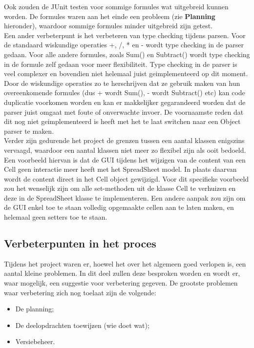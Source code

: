 \documentclass[a4paper,11pt]{article}
\begin{document}
Ook zouden de JUnit testen voor sommige formules wat uitgebreid kunnen worden. De formules waren aan het einde een probleem (zie \textbf{Planning} hieronder), waardoor sommige formules minder uitgebreid zijn getest.\\

Een ander verbeterpunt is het verbeteren van type checking tijdens parsen. Voor de standaard wiskundige operaties +, /, * en - wordt type checking in de parser gedaan. Voor alle andere formules, zoals Sum() en Subtract() wordt type checking in de formule zelf gedaan voor meer flexibiliteit. Type checking in de parser is veel complexer en bovendien niet helemaal juist geimplementeerd op dit moment. Door de wiskundige operaties zo te herschrijven dat ze gebruik maken van hun overeenkomende formules (dus + wordt Sum(), - wordt Subtract() etc) kan code duplicatie voorkomen worden en kan er makkelijker gegarandeerd worden dat de parser juist omgaat met foute of onverwachte invoer. De voornaamste reden dat dit nog niet geimplementeerd is heeft met het te laat switchen naar een Object parser te maken.\\

Verder zijn gedurende het project de grenzen tussen een aantal klassen enigszins vervaagd, waardoor een aantal klassen niet meer zo flexibel zijn als ooit bedoeld. Een voorbeeld hiervan is dat de GUI tijdens het wijzigen van de content van een Cell geen interactie meer heeft met het SpreadSheet model. In plaats daarvan wordt de content direct in het Cell object gewijzigd. Voor dit specifieke voorbeeld zou het wenselijk zijn om alle set-methoden uit de klasse Cell te verhuizen en deze in de SpreadSheet klasse te implementeren. Een andere aanpak zou zijn om de GUI enkel toe te staan volledig opgemaakte cellen aan te laten maken, en helemaal geen setters toe te staan.

\subsection{Verbeterpunten in het proces}
Tijdens het project waren er, hoewel het over het algemeen goed verlopen is, een aantal kleine problemen. In dit deel zullen deze besproken worden en wordt er, waar mogelijk, een suggestie voor verbetering gegeven. De grootste problemen waar verbetering zich nog toelaat zijn de volgende:
\begin{itemize}
	\item De planning;
	\item De deelopdrachten toewijzen (wie doet wat);
	\item Versiebeheer.
\end{itemize}
\end{document}
